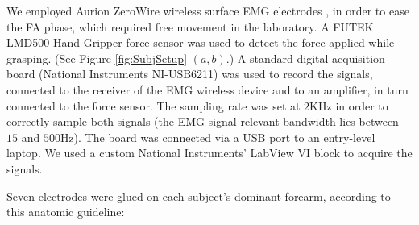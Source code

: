 \documentclass[10pt]{bmc_article}
\def\texttt{[image: ]}
\newenvironment{bmcformat}
  {\begin{raggedright}\baselineskip20pt\sloppy\setboolean{publ}{false}}
  {\end{raggedright}\baselineskip20pt\sloppy}
\begin{document}
\begin{bmcformat}

We employed Aurion ZeroWire wireless surface EMG
electrodes \cite{zerowire}, in order to ease the FA
phase, which required free movement in the laboratory. A FUTEK LMD500
Hand Gripper force sensor \cite{LMD500} was used to detect the
force applied while grasping. (See Figure \ref{fig:SubjSetup} $(a,b)$.)
A standard digital acquisition board
(National Instruments NI-USB6211) was used to record the signals,
connected to the receiver of the EMG wireless device and to an
amplifier, in turn connected to the force sensor. The sampling rate was set at
$2$KHz in order to correctly sample both signals (the EMG signal
relevant bandwidth lies between $15$ and $500$Hz). The board was connected via a
USB port to an entry-level laptop. We used a custom National
Instruments' LabView VI block to acquire the signals.


Seven electrodes were glued on each subject's dominant
forearm, according to this anatomic guideline:

\begin{itemize}


\end{itemize}
\end{bmcformat}
\end{document}
